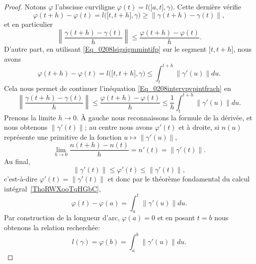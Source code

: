 \begin{proof}
    Notons $\varphi$ l'abscisse curviligne $\varphi(t)=l\big( \mathopen[ a , t \mathclose],\gamma \big)$. Cette dernière vérifie
    \begin{equation}
        \varphi(t+h)-\varphi(t)=l\big( \mathopen[ t , t+h \mathclose],\gamma \big)\geq \| \gamma(t+h)-\gamma(t) \|,
    \end{equation}
    et en particulier
    \begin{equation}     \label{Eq_0208intervpvpintfrach}
        \left\| \frac{ \gamma(t+h)-\gamma(t) }{ h } \right\|\leq \frac{ \varphi(t+h)-\varphi(t) }{ h }.
    \end{equation}
    D'autre part, en utilisant \eqref{Eq_0208lsigsigmmintifp} sur le segment $\mathopen[ t , t+h \mathclose]$, nous avons
    \begin{equation}
        \varphi(t+h)-\varphi(t)=l\big( \mathopen[ t , t+h \mathclose],\gamma \big)\leq\int_{t}^{t+h}\| \gamma'(u) \|du.
    \end{equation}
    Cela nous permet de continuer l'inéquation \eqref{Eq_0208intervpvpintfrach} en
    \begin{equation}
        \left\| \frac{ \gamma(t+h)-\gamma(t) }{ h } \right\|\leq\frac{ \varphi(t+h)-\varphi(t) }{ h }\leq\frac{1}{ h }\int_t^{t+h}\| \gamma'(u) \|du.
    \end{equation}
    Prenons la limite $h\to 0$. À gauche nous reconnaissons la formule de la dérivée, et nous obtenons $\| \gamma'(t) \|$; au centre nous avons $\varphi'(t)$ et à droite, si $n(u)$ représente une primitive de la fonction $u\mapsto\| \gamma'(u) \|$,
    \begin{equation}
        \lim_{h\to 0}\frac{ n(t+h)-n(t) }{ h }=n'(t)=\| \gamma'(t) \|.
    \end{equation}
    Au final,
    \begin{equation}
        \| \gamma'(t) \|\leq \varphi'(t)\leq\| \gamma'(t) \|,
    \end{equation}
    c'est-à-dire $\varphi'(t)=\| \gamma'(t) \|$ et donc par le théorème fondamental du calcul intégral~\ref{ThoRWXooTqHGbC},
    \begin{equation}
        \varphi(t)-\varphi(a)=\int_a^t\| \gamma'(u) \|du.
    \end{equation}
    Par construction de la longueur d'arc, $\varphi(a)=0$ et en posant $t=b$ nous obtenons la relation recherchée:
    \begin{equation}
        l(\gamma)=\varphi(b)=\int_a^b\| \gamma'(u) \|du.
    \end{equation}
\end{proof}

